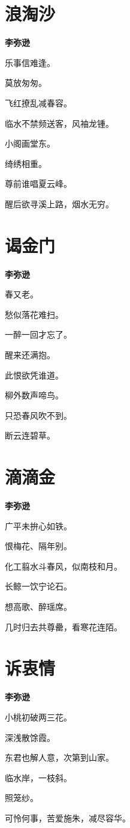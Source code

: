 \documentclass[12pt,a4paper]{ctexbook}
\begin{document}
\section{浪淘沙}
\textbf{李弥逊}\par\vspace{0.5em}
乐事信难逢。\par
莫放匆匆。\par
飞红撩乱减春容。\par
临水不禁频送客，风袖龙锺。\par
小阁画堂东。\par
绮绣相重。\par
尊前谁唱夏云峰。\par
醒后欲寻溪上路，烟水无穷。\par

\section{谒金门}
\textbf{李弥逊}\par\vspace{0.5em}
春又老。\par
愁似落花难扫。\par
一醉一回才忘了。\par
醒来还满抱。\par
此恨欲凭谁道。\par
柳外数声啼鸟。\par
只恐春风吹不到。\par
断云连碧草。\par

\section{滴滴金}
\textbf{李弥逊}\par\vspace{0.5em}
广平未拚心如铁。\par
恨梅花、隔年别。\par
化工翦水斗春风，似南枝和月。\par
长鲸一饮宁论石。\par
想高歌、醉瑶席。\par
几时归去共尊罍，看寒花连陌。\par

\section{诉衷情}
\textbf{李弥逊}\par\vspace{0.5em}
小桃初破两三花。\par
深浅散馀霞。\par
东君也解人意，次第到山家。\par
临水岸，一枝斜。\par
照笼纱。\par
可怜何事，苦爱施朱，减尽容华。\par
\end{document}
